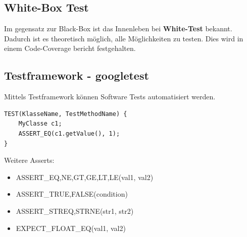 \subsection{White-Box Test}
 Im gegensatz zur Black-Box ist das Innenleben bei \textbf{White-Test} bekannt. Dadurch ist es theoretisch möglich, alle Möglichkeiten zu testen. Dies wird in einem Code-Coverage bericht festgehalten.
 
\subsection{Testframework - googletest}
Mittels Testframework können Software Tests automatisiert werden. 
\begin{lstlisting}
TEST(KlasseName, TestMethodName) {
	MyClasse c1;
	ASSERT_EQ(c1.getValue(), 1);
}
\end{lstlisting}
Weitere Asserts:
\begin{itemize}[nosep]
	\item ASSERT\_EQ,NE,GT,GE,LT,LE(val1, val2)
	\item ASSERT\_TRUE,FALSE(condition)
	\item ASSERT\_STREQ,STRNE(str1, str2)
	\item EXPECT\_FLOAT\_EQ(val1, val2)
\end{itemize}